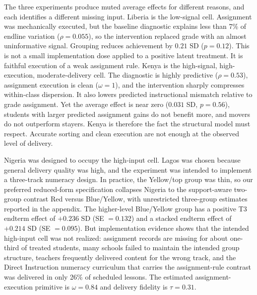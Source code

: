 \documentclass[11pt]{article}
\begin{document}
The three experiments produce muted average effects for different reasons, and each identifies a different missing input. Liberia is the low-signal cell. Assignment was mechanically executed, but the baseline diagnostic explains less than 7\% of endline variation ($\rho = 0.055$), so the intervention replaced grade with an almost uninformative signal. Grouping reduces achievement by $0.21$ SD ($p = 0.12$). This is not a small implementation dose applied to a positive latent treatment. It is faithful execution of a weak assignment rule. Kenya is the high-signal, high-execution, moderate-delivery cell. The diagnostic is highly predictive ($\rho = 0.53$), assignment execution is clean ($\omega = 1$), and the intervention sharply compresses within-class dispersion. It also lowers predicted instructional mismatch relative to grade assignment. Yet the average effect is near zero ($0.031$ SD, $p = 0.56$), students with larger predicted assignment gains do not benefit more, and movers do not outperform stayers. Kenya is therefore the fact the structural model must respect. Accurate sorting and clean execution are not enough at the observed level of delivery.

Nigeria was designed to occupy the high-input cell. Lagos was chosen because general delivery quality was high, and the experiment was intended to implement a three-track numeracy design. In practice, the Yellow/top group was thin, so our preferred reduced-form specification collapses Nigeria to the support-aware two-group contrast Red versus Blue/Yellow, with unrestricted three-group estimates reported in the appendix. The higher-level Blue/Yellow group has a positive T3 endterm effect of $+0.236$ SD (SE $=0.132$) and a stacked endterm effect of $+0.214$ SD (SE $=0.095$). But implementation evidence shows that the intended high-input cell was not realized: assignment records are missing for about one-third of treated students, many schools failed to maintain the intended group structure, teachers frequently delivered content for the wrong track, and the Direct Instruction numeracy curriculum that carries the assignment-rule contrast was delivered in only 26\% of scheduled lessons. The estimated assignment-execution primitive is $\omega=0.84$ and delivery fidelity is $\tau=0.31$.
\end{document}
